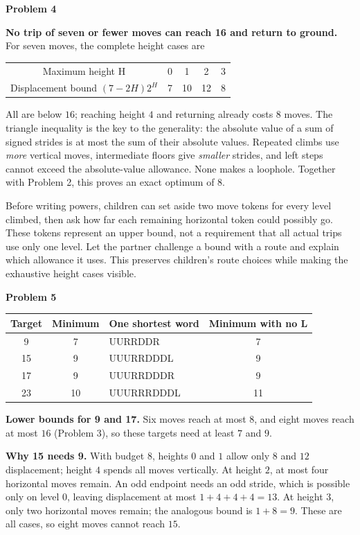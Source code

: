 \documentclass[11pt,letterpaper]{article}
\newcommand{\sect}[1]{\par\vspace{5pt}{\large\bfseries #1}\par}
\newcommand{\prob}[1]{\par\vspace{3pt}\textbf{Problem #1}\par}
\begin{document}
\prob{4}
\textbf{No trip of seven or fewer moves can reach 16 and return to ground.}
For seven moves, the complete height cases are
\begin{center}
\begin{tabular}{@{}ccccc@{}}\toprule
Maximum height H & 0 & 1 & 2 & 3\\
Displacement bound $(7-2H)2^H$ & 7 & 10 & 12 & 8\\\bottomrule
\end{tabular}
\end{center}
All are below $16$; reaching height $4$ and returning already costs $8$ moves.
The triangle inequality is the key to the generality: the absolute value of a
sum of signed strides is at most the sum of their absolute values. Repeated
climbs use \emph{more} vertical moves, intermediate floors give \emph{smaller}
strides, and left steps cannot exceed the absolute-value allowance. None makes
a loophole. Together with Problem 2, this proves an exact optimum of $8$.

\sect{Keep the argument concrete}
Before writing powers, children can set aside two move tokens for every level
climbed, then ask how far each remaining horizontal token could possibly go.
These tokens represent an upper bound, not a requirement that all actual trips
use only one level. Let the partner challenge a bound with a route and explain
which allowance it uses. This preserves children's route choices while making
the exhaustive height cases visible.
\newpage
\prob{5}
\begin{center}
\begin{tabular}{@{}cclc@{}}\toprule
Target & Minimum & One shortest word & Minimum with no L\\\midrule
9 & 7 & UURRDDR & 7\\
15 & 9 & UUURRDDDL & 9\\
17 & 9 & UUURRDDDR & 9\\
23 & 10 & UUURRRDDDL & 11\\\bottomrule
\end{tabular}
\end{center}
\textbf{Lower bounds for 9 and 17.} Six moves reach at most $8$, and eight
moves reach at most $16$ (Problem 3), so these targets need at least $7$ and $9$.

\textbf{Why 15 needs 9.} With budget $8$, heights $0$ and $1$ allow only $8$
and $12$ displacement; height $4$ spends all moves vertically. At height $2$,
at most four horizontal moves remain. An odd endpoint needs an odd stride,
which is possible only on level $0$, leaving displacement at most
$1+4+4+4=13$. At height $3$, only two horizontal moves remain; the analogous
bound is $1+8=9$. These are all cases, so eight moves cannot reach $15$.
\end{document}
